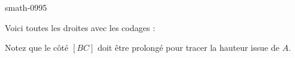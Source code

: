 
\begin{corrige}{smath-0995}

Voici toutes les droites avec les codages :
\begin{center}
   
\end{center}
Notez que le côté \( [BC]\) doit être prolongé pour tracer la hauteur issue de \( A\).

\end{corrige}
